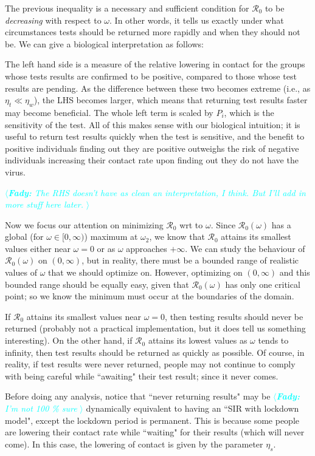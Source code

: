 \documentclass{article}
\newcommand{\fady}[1]{\textcolor{cyan}{$\langle${\slshape{\bfseries Fady:} #1 }$\rangle$}}
\newcommand{\Rnum}{\mathcal{R}_0}
\begin{document}
The previous inequality is a necessary and sufficient condition for $\Rnum$ to be \emph{decreasing} with respect to $\omega$. In other words, it tells us exactly under what circumstances tests should be returned more rapidly and when they should not be. We can give a biological interpretation as follows:

The left hand side is a measure of the relative lowering in contact for the groups whose tests results are confirmed to be positive, compared to those whose test results are pending. As the difference between these two becomes extreme (i.e., as $\eta_t \ll \eta_{w}$), the LHS becomes larger, which means that returning test results faster may become beneficial. The whole left term is scaled by $P_i$, which is the sensitivity of the test. All of this makes sense with our biological intuition; it is useful to return test results quickly when the test is sensitive, and the benefit to positive individuals finding out they are positive outweighs the risk of negative individuals increasing their contact rate upon finding out they do not have the virus.

\fady{The RHS doesn't have as clean an interpretation, I think. But I'll add in more stuff here later.}


Now we focus our attention on minimizing $\Rnum$ wrt to $\omega$. Since $\Rnum(\omega)$ has a global (for $\omega \in [0,\infty)$) maximum at $\omega_2$, we know that $\Rnum$ attains its smallest values either near $\omega = 0$ or as $\omega$ approaches $+\infty$. We can study the behaviour of $\Rnum(\omega)$ on $(0,\infty)$, but in reality, there must be a bounded range of realistic values of $\omega$ that we should optimize on. However, optimizing on $(0,\infty)$ and this bounded range should be equally easy, given that $\Rnum(\omega)$ has only one critical point; so we know the minimum must occur at the boundaries of the domain.

If $\Rnum$ attains its smallest values near $\omega = 0$, then testing results should never be returned (probably not a practical implementation, but it does tell us something interesting). On the other hand, if $\Rnum$ attains its lowest values as $\omega$ tends to infinity, then test results should be returned as quickly as possible. Of course, in reality, if test results were never returned, people may not continue to comply with being careful while ``awaiting" their test result; since it never comes. 

Before doing any analysis, notice that ``never returning results" may be \fady{I'm not 100 \% sure} dynamically equivalent to having an ``SIR with lockdown model", except the lockdown period is permanent. This is because some people are lowering their contact rate while ``waiting" for their results (which will never come). In this case, the lowering of contact is given by the parameter $\eta_s$. 
\end{document}
